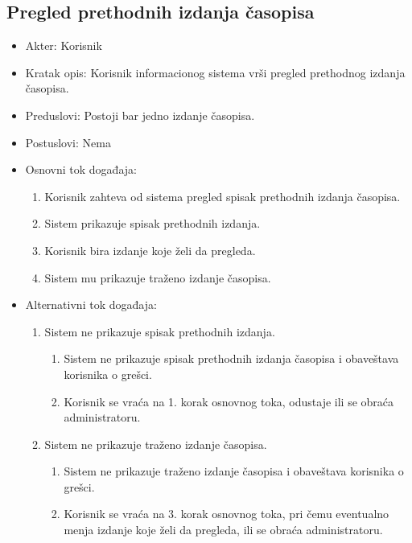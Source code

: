 \documentclass[a4paper]{article}
\begin{document}
\subsection{Pregled prethodnih izdanja časopisa}
\begin{itemize}
    \item Akter: Korisnik
    \item Kratak opis: Korisnik informacionog sistema vrši pregled prethodnog izdanja časopisa.
    \item Preduslovi: Postoji bar jedno izdanje časopisa.
    \item Postuslovi: Nema
    \item Osnovni tok događaja:
        \begin{enumerate}
            \item Korisnik zahteva od sistema pregled spisak prethodnih izdanja časopisa.
            \item Sistem prikazuje spisak prethodnih izdanja.
            \item Korisnik bira izdanje koje želi da pregleda.
            \item Sistem mu prikazuje traženo izdanje časopisa.
        \end{enumerate}
    \item Alternativni tok događaja:
        \begin{enumerate}
            \item Sistem ne prikazuje spisak prethodnih izdanja.
            \begin{enumerate}
                \item Sistem ne prikazuje spisak prethodnih izdanja časopisa i obaveštava korisnika o grešci.
                \item Korisnik se vraća na 1. korak osnovnog toka, odustaje ili se obraća administratoru.
            \end{enumerate}
            \item Sistem ne prikazuje traženo izdanje časopisa.
            \begin{enumerate}
                \item Sistem ne prikazuje traženo izdanje časopisa i obaveštava korisnika o grešci.
                \item Korisnik se vraća na 3. korak osnovnog toka, pri čemu eventualno menja izdanje koje želi da pregleda, ili se obraća administratoru.
            \end{enumerate}
        \end{enumerate}
\end{itemize}
\end{document}
